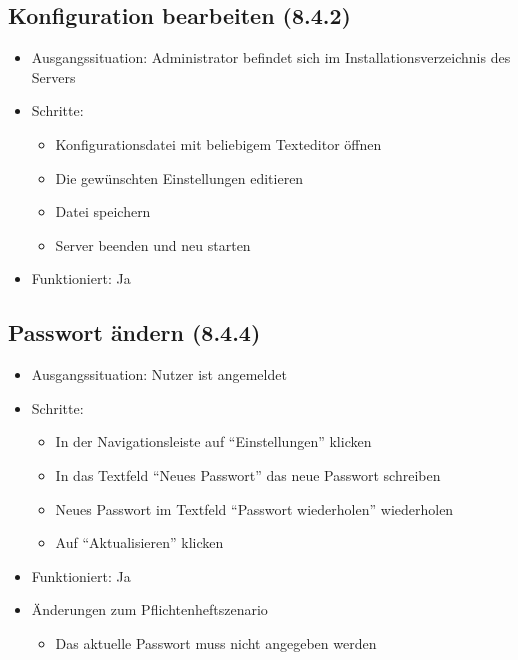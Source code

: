 \documentclass[a4paper]{scrreprt}
\begin{document}
            \subsection{Konfiguration bearbeiten (8.4.2)}
            \begin{itemize}
                \item Ausgangssituation: Administrator befindet sich im Installationsverzeichnis des Servers
                \item Schritte:
                    \begin{itemize}
                        \item Konfigurationsdatei mit beliebigem Texteditor öffnen
                        \item Die gewünschten Einstellungen editieren
                        \item Datei speichern
                        \item Server beenden und neu starten
                    \end{itemize}
                \item Funktioniert: Ja
            \end{itemize}

            \subsection{Passwort ändern (8.4.4)}
            \begin{itemize}
                \item Ausgangssituation: Nutzer ist angemeldet
                \item Schritte:
                    \begin{itemize}
                        \item In der Navigationsleiste auf \enquote{Einstellungen} klicken
                        \item In das Textfeld \enquote{Neues Passwort} das neue Passwort schreiben
                        \item Neues Passwort im Textfeld \enquote{Passwort wiederholen} wiederholen
                        \item Auf \enquote{Aktualisieren} klicken
                    \end{itemize}
                \item Funktioniert: Ja
                \item Änderungen zum Pflichtenheftszenario
                \begin{itemize}
                    \item Das aktuelle Passwort muss nicht angegeben werden
                \end{itemize}
            \end{itemize}
\end{document}
